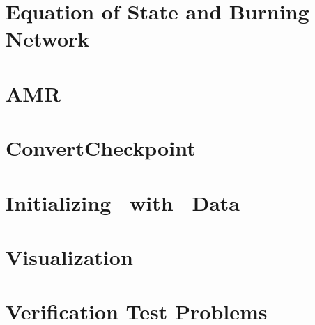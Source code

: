 \documentclass[11pt]{book}
\makeatletter
\renewcommand*\cleardoublepage{\clearpage\if@twoside
\ifodd\c@page\else
\hbox{}
\thispagestyle{empty}
\newpage
\if@twocolumn\hbox{}\newpage\fi\fi\fi}
\makeatother
\begin{document}
\chapter{Equation of State and Burning Network}


\chapter{AMR}


\chapter{ConvertCheckpoint}


\chapter{Initializing \castro\ with \maestro\ Data}


\chapter{Visualization}


\chapter{Verification Test Problems}



\backmatter

\renewcommand\bibname{References}



\cleardoublepage
{}
{}
\printindex
\end{document}

